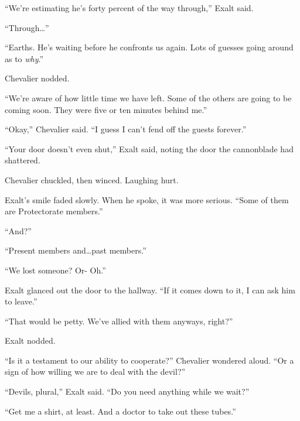 ``We're estimating he's forty percent of the way through,'' Exalt said.



``Through\ldots''



``Earths.  He's waiting before he confronts us again.  Lots of guesses going around as to \emph{why}.''



Chevalier nodded.



``We're aware of how little time we have left.  Some of the others are going to be coming soon.  They were five or ten minutes behind me.''



``Okay,'' Chevalier said.  ``I guess I can't fend off the guests forever.''



``Your door doesn't even shut,'' Exalt said, noting the door the cannonblade had shattered.



Chevalier chuckled, then winced.  Laughing hurt.



Exalt's smile faded slowly.  When he spoke, it was more serious.  ``Some of them are Protectorate members.''



``And?''



``Present members and\ldots past members.''



``We lost someone?  Or-  Oh.''



Exalt glanced out the door to the hallway.  ``If it comes down to it, I can ask him to leave.''



``That would be petty.  We've allied with them anyways, right?''



Exalt nodded.



``Is it a testament to our ability to cooperate?'' Chevalier wondered aloud.  ``Or a sign of how willing we are to deal with the devil?''



``Devils, plural,'' Exalt said.  ``Do you need anything while we wait?''



``Get me a shirt, at least.  And a doctor to take out these tubes.''



